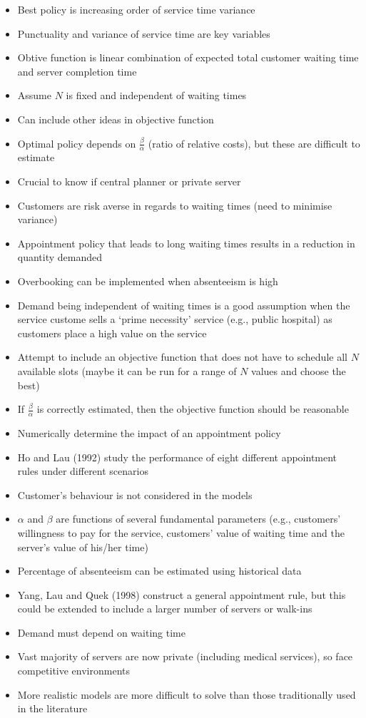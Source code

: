 \documentclass{article}
\begin{document}
\begin{itemize}
    \item Best policy is increasing order of service time variance
    \item Punctuality and variance of service time are key variables
    \item Obtive function is linear combination of expected total customer waiting time and server completion time
    \item Assume $N$ is fixed and independent of waiting times
    \item Can include other ideas in objective function
    \item Optimal policy depends on $\frac{\beta}{\alpha}$ (ratio of relative costs), but these are difficult to estimate
    \item Crucial to know if central planner or private server
    \item Customers are risk averse in regards to waiting times (need to minimise variance)
    \item Appointment policy that leads to long waiting times results in a reduction in quantity demanded
    \item Overbooking can be implemented when absenteeism is high
    \item Demand being independent of waiting times is a good assumption when the service custome sells a `prime necessity' service (e.g., public hospital) as customers place a high value on the service
    \item Attempt to include an objective function that does not have to schedule all $N$ available slots (maybe it can be run for a range of $N$ values and choose the best)
    \item If $\frac{\beta}{\alpha}$ is correctly estimated, then the objective function should be reasonable
    \item Numerically determine the impact of an appointment policy
    \item Ho and Lau (1992) study the performance of eight different appointment rules under different scenarios
    \item Customer's behaviour is not considered in the models
    \item $\alpha$ and $\beta$ are functions of several fundamental parameters (e.g., customers' willingness to pay for the service, customers' value of waiting time and the server's value of his/her time)
    \item Percentage of absenteeism can be estimated using historical data
    \item Yang, Lau and Quek (1998) construct a general appointment rule, but this could be extended to include a larger number of servers or walk-ins
    \item Demand must depend on waiting time
    \item Vast majority of servers are now private (including medical services), so face competitive environments
    \item More realistic models are more difficult to solve than those traditionally used in the literature
\end{itemize}
\end{document}
